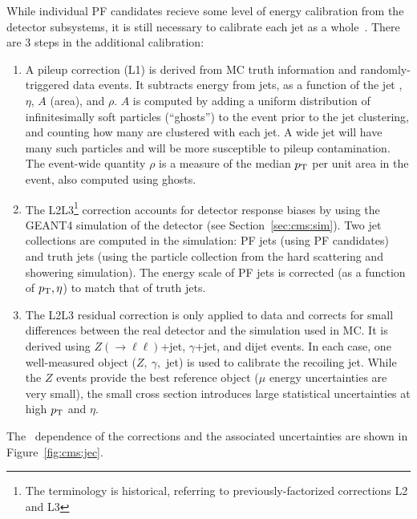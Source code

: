 While individual PF candidates recieve some level of energy calibration from the detector subsystems, it is still necessary to calibrate each jet as a whole~\cite{jec}.
There are 3 steps in the additional calibration:
\begin{enumerate}
\item A pileup correction (L1) is derived from MC truth information and randomly-triggered data events.
It subtracts energy from jets, as a function of the jet \pt, $\eta$, $A$ (area), and $\rho$. 
$A$ is computed by adding a uniform distribution of infinitesimally soft particles (``ghosts'') to the event prior to the jet clustering, and counting how many are clustered with each jet. 
A wide jet will have many such particles and will be more susceptible to pileup contamination.
The event-wide quantity $\rho$ is a measure of the median $p_\mathrm{T}$ per unit area in the event, also computed using ghosts.

\item The L2L3\footnote{The terminology is historical, referring to previously-factorized corrections L2 and L3} correction accounts for detector response biases by using the GEANT4 simulation of the detector (see Section~\ref{sec:cms:sim}).
Two jet collections are computed in the simulation: PF jets (using PF candidates) and truth jets (using the particle collection from the hard scattering and showering simulation). 
The energy scale of PF jets is corrected (as a function of $p_\mathrm{T},\eta$) to match that of truth jets.

\item The L2L3 residual correction is only applied to data and corrects for small differences between the real detector and the simulation used in MC.
It is derived using $Z(\rightarrow\ell\ell)$+jet, $\gamma$+jet, and dijet events.
In each case, one well-measured object ($Z,~\gamma,$ jet) is used to calibrate the recoiling jet.
While the $Z$ events provide the best reference object ($\mu$ energy uncertainties are very small), the small cross section introduces large statistical uncertainties at high $p_\mathrm{T}$ and $\eta$. 
\end{enumerate}
The \pt~dependence of the corrections and the associated uncertainties are shown in Figure~\ref{fig:cms:jec}.

